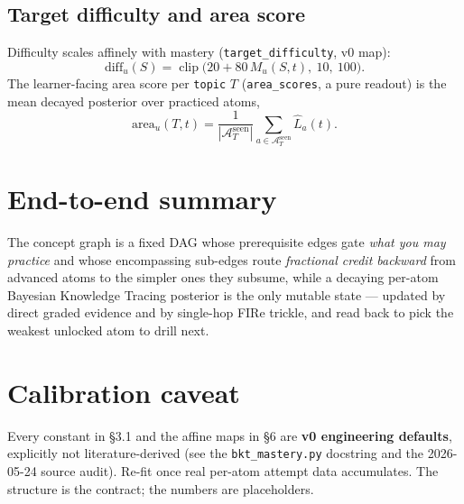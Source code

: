 \documentclass[11pt]{article}
\newcommand{\Lhat}{\hat{L}}
\newcommand{\clip}{\operatorname{clip}}
\begin{document}
\subsection{Target difficulty and area score}
Difficulty scales affinely with mastery (\texttt{target\_difficulty}, v0 map):
\[
  \mathrm{diff}_u(S)=\clip\!\big(20+80\,M_u(S,t),\ 10,\ 100\big).
\]
The learner-facing area score per \texttt{topic} $T$ (\texttt{area\_scores}, a
pure readout) is the mean decayed posterior over practiced atoms,
\[
  \mathrm{area}_u(T,t)=\frac{1}{|\mathcal{A}_T^{\mathrm{seen}}|}
  \sum_{a\in\mathcal{A}_T^{\mathrm{seen}}}\Lhat_a(t).
\]

\section{End-to-end summary}
\begin{keybox}
The concept graph is a fixed DAG whose prerequisite edges gate \emph{what you may
practice} and whose encompassing sub-edges route \emph{fractional credit
backward} from advanced atoms to the simpler ones they subsume, while a decaying
per-atom Bayesian Knowledge Tracing posterior is the only mutable state ---
updated by direct graded evidence and by single-hop FIRe trickle, and read back
to pick the weakest unlocked atom to drill next.
\end{keybox}

\section{Calibration caveat}
Every constant in \S3.1 and the affine maps in \S6 are \textbf{v0 engineering
defaults}, explicitly not literature-derived (see the \texttt{bkt\_mastery.py}
docstring and the 2026-05-24 source audit). Re-fit once real per-atom attempt
data accumulates. The structure is the contract; the numbers are placeholders.
\end{document}
